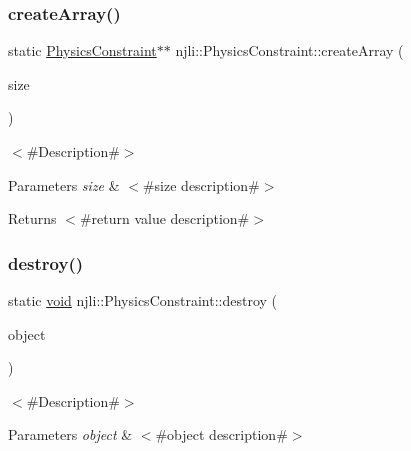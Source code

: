 \subsubsection{\texorpdfstring{create\+Array()}{createArray()}}
{\footnotesize\ttfamily static \mbox{\hyperlink{classnjli_1_1_physics_constraint}{Physics\+Constraint}}$\ast$$\ast$ njli\+::\+Physics\+Constraint\+::create\+Array (\begin{DoxyParamCaption}\item[{const \mbox{\hyperlink{_util_8h_a10e94b422ef0c20dcdec20d31a1f5049}{u32}}}]{size }\end{DoxyParamCaption})\hspace{0.3cm}{\ttfamily [static]}}

$<$\#\+Description\#$>$


\begin{DoxyParams}{Parameters}
{\em size} & $<$\#size description\#$>$\\
\hline
\end{DoxyParams}
\begin{DoxyReturn}{Returns}
$<$\#return value description\#$>$ 
\end{DoxyReturn}
\mbox{\label{classnjli_1_1_physics_constraint_a3b197c229e8bd4a030a54bdba54e081a}} 
\subsubsection{\texorpdfstring{destroy()}{destroy()}}
{\footnotesize\ttfamily static \mbox{\hyperlink{_thread_8h_af1e856da2e658414cb2456cb6f7ebc66}{void}} njli\+::\+Physics\+Constraint\+::destroy (\begin{DoxyParamCaption}\item[{\mbox{\hyperlink{classnjli_1_1_physics_constraint}{Physics\+Constraint}} $\ast$}]{object }\end{DoxyParamCaption})\hspace{0.3cm}{\ttfamily [static]}}

$<$\#\+Description\#$>$


\begin{DoxyParams}{Parameters}
{\em object} & $<$\#object description\#$>$ \\
\hline
\end{DoxyParams}
\mbox{\label{classnjli_1_1_physics_constraint_a100472a7edab98f9bcd213459f3ae2c6}} 
